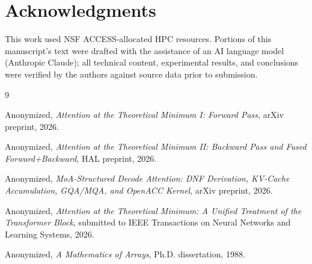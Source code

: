 \documentclass[conference]{IEEEtran}
\begin{document}
\section*{Acknowledgments}

This work used NSF ACCESS-allocated HPC resources. Portions of this
manuscript's text were drafted with the assistance of an AI language
model (Anthropic Claude); all technical content, experimental results,
and conclusions were verified by the authors against source data prior
to submission.

\begin{thebibliography}{9}

Anonymized, \emph{Attention at the Theoretical Minimum I: Forward
Pass}, arXiv preprint, 2026.

Anonymized, \emph{Attention at the Theoretical Minimum II: Backward
Pass and Fused Forward+Backward}, HAL preprint, 2026.

Anonymized, \emph{MoA-Structured Decode Attention: DNF Derivation,
KV-Cache Accumulation, GQA/MQA, and OpenACC Kernel}, arXiv preprint,
2026.

Anonymized, \emph{Attention at the Theoretical Minimum: A Unified
Treatment of the Transformer Block}, submitted to IEEE Transactions on
Neural Networks and Learning Systems, 2026.

Anonymized, \emph{A Mathematics of Arrays}, Ph.D. dissertation, 1988.

\end{thebibliography}
\end{document}
